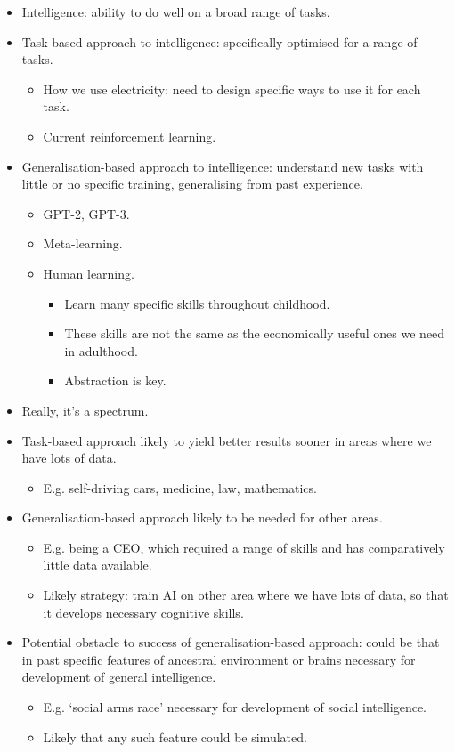 \begin{itemize}
    \item Intelligence: ability to do well on a broad range of tasks.
    \item Task-based approach to intelligence: specifically optimised for a range of tasks.
    \begin{itemize}
        \item How we use electricity: need to design specific ways to use it for each task.
        \item Current reinforcement learning.
    \end{itemize}
    \item Generalisation-based approach to intelligence: understand new tasks with little or no specific training, generalising from past experience.
    \begin{itemize}
        \item GPT-2, GPT-3.
        \item Meta-learning.
        \item Human learning.
        \begin{itemize}
            \item Learn many specific skills throughout childhood.
            \item These skills are not the same as the economically useful ones we need in adulthood.
            \item Abstraction is key.
        \end{itemize}
    \end{itemize}
    \item Really, it's a spectrum.
    \item Task-based approach likely to yield better results sooner in areas where we have lots of data.
    \begin{itemize}
        \item E.g. self-driving cars, medicine, law, mathematics.
    \end{itemize}
    \item Generalisation-based approach likely to be needed for other areas.
    \begin{itemize}
        \item  E.g. being a CEO, which required a range of skills and has comparatively little data available.
        \item Likely strategy: train AI on other area where we have lots of data, so that it develops necessary cognitive skills.
    \end{itemize}
    \item Potential obstacle to success of generalisation-based approach: could be that in past specific features of ancestral environment or    brains necessary for development of general intelligence.
    \begin{itemize}
        \item E.g. `social arms race' necessary for development of social intelligence.
        \item Likely that any such feature could be simulated.
    \end{itemize}    
\end{itemize}


